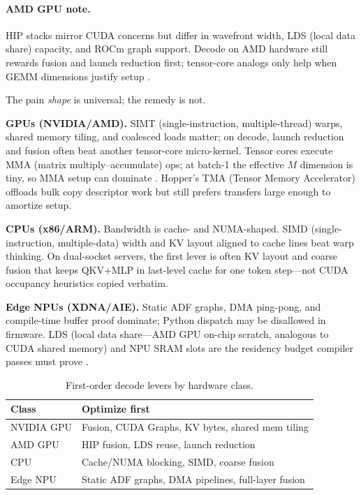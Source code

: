 \paragraph{AMD GPU note.}
HIP stacks mirror CUDA concerns but differ in wavefront width, LDS (local data share) capacity, and ROCm graph support.
Decode on AMD hardware still rewards fusion and launch reduction first; tensor-core analogs only help when GEMM dimensions justify setup \citep{amd2024aie}.


The pain \emph{shape} is universal; the remedy is not.

\textbf{GPUs (NVIDIA/AMD).}
SIMT (single-instruction, multiple-thread) warps, shared memory tiling, and coalesced loads matter; on decode, launch reduction and fusion often beat another tensor-core micro-kernel.
Tensor cores execute MMA (matrix multiply--accumulate) ops; at batch-1 the effective $M$ dimension is tiny, so MMA setup can dominate \citep{semianalysis2024tma}.
Hopper's TMA (Tensor Memory Accelerator) offloads bulk copy descriptor work but still prefers transfers large enough to amortize setup.

\textbf{CPUs (x86/ARM).}
Bandwidth is cache- and NUMA-shaped.
SIMD (single-instruction, multiple-data) width and KV layout aligned to cache lines beat warp thinking.
On dual-socket servers, the first lever is often KV layout and coarse fusion that keeps QKV+MLP in last-level cache for one token step---not CUDA occupancy heuristics copied verbatim.

\textbf{Edge NPUs (XDNA/AIE).}
Static ADF graphs, DMA ping-pong, and compile-time buffer proof dominate; Python dispatch may be disallowed in firmware.
LDS (local data share---AMD GPU on-chip scratch, analogous to CUDA shared memory) and NPU SRAM slots are the residency budget compiler passes must prove \citep{amd2024xdna,amd2024aie}.

\begin{table}[t]
\centering
\caption{First-order decode levers by hardware class.}
\label{tab:hw_priorities}
\begin{tabular}{lp{3.3in}}
\toprule
\textbf{Class} & \textbf{Optimize first} \\
\midrule
NVIDIA GPU & Fusion, CUDA Graphs, KV bytes, shared mem tiling \\
AMD GPU & HIP fusion, LDS reuse, launch reduction \\
CPU & Cache/NUMA blocking, SIMD, coarse fusion \\
Edge NPU & Static ADF graphs, DMA pipelines, full-layer fusion \\
\bottomrule
\end{tabular}
\end{table}

